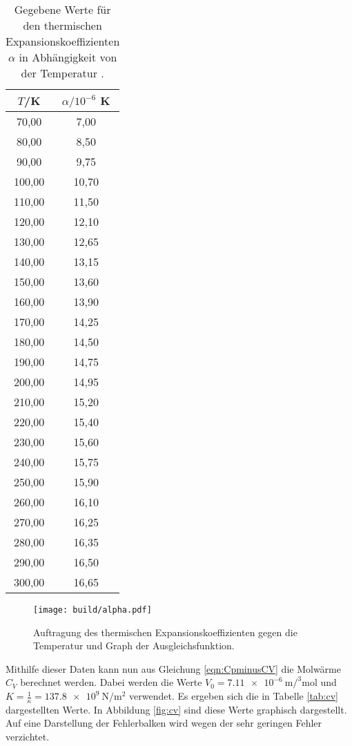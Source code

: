 \begin{table}[htp]
	\begin{center}
    \caption{Gegebene Werte für den thermischen Expansionskoeffizienten $\alpha$ in Abhängigkeit von der
    Temperatur \cite{versuchsanleitung}.}
    \label{tab:alpha}
		\begin{tabular}{cc}
		\toprule
			{$T$/K} & {$\alpha/10^{-6}$ K}\\
			\midrule
			70,00 & 7,00\\
			80,00 & 8,50\\
			90,00 & 9,75\\
			100,00 & 10,70\\
			110,00 & 11,50\\
			120,00 & 12,10\\
			130,00 & 12,65\\
			140,00 & 13,15\\
			150,00 & 13,60\\
			160,00 & 13,90\\
			170,00 & 14,25\\
			180,00 & 14,50\\
			190,00 & 14,75\\
			200,00 & 14,95\\
			210,00 & 15,20\\
			220,00 & 15,40\\
			230,00 & 15,60\\
			240,00 & 15,75\\
			250,00 & 15,90\\
			260,00 & 16,10\\
			270,00 & 16,25\\
			280,00 & 16,35\\
			290,00 & 16,50\\
			300,00 & 16,65\\
		\bottomrule
		\end{tabular}
	\end{center}
\end{table}

\begin{figure}
  \centering
  \texttt{[image: build/alpha.pdf]}
  \caption{Auftragung des thermischen Expansionskoeffizienten gegen die Temperatur und Graph der
  Ausgleichsfunktion.}
  \label{fig:alpha}
\end{figure}

Mithilfe dieser Daten kann nun aus Gleichung \eqref{eqn:CpminusCV} die Molwärme $C_V$
berechnet werden. Dabei werden die Werte $V_0=\SI{7.11e-6}{\metre\cubic\per\mole}$
\cite{molvolumen} und $K=\frac{1}{\kappa}=\SI{137.8e9}{\newton\per\metre\squared}$
\cite{kompressionsmodul} verwendet. Es ergeben sich die
in Tabelle \ref{tab:cv} dargestellten Werte. In Abbildung \ref{fig:cv} sind diese Werte
graphisch dargestellt. Auf eine Darstellung der Fehlerbalken wird wegen der sehr
geringen Fehler verzichtet.

